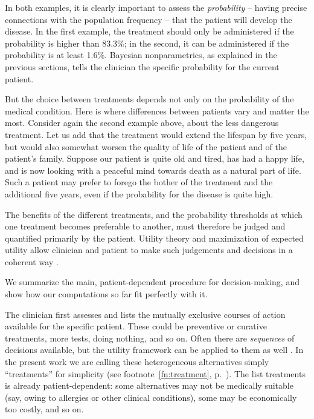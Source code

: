 \documentclass[a4paper,12pt,%
onecolumn,oneside,article,%
british%
]{memoir}
\theoremstyle{remark}
\theoremstyle{innote}
\renewcommand*{\|}[1][]{\nonscript\:#1\vert\nonscript\:\mathopen{}}
\begin{document}
In both examples, it is clearly important to assess the \emph{probability} -- having precise connections with the population frequency -- that the patient will develop the disease. In the first example, the treatment should only be administered if the probability is higher than 83.3\%; in the second, it can be administered if the probability is at least 1.6\%. Bayesian nonparametrics, as explained in the previous sections, tells the clinician the specific probability for the current patient.

But the choice between treatments depends not only on the probability of the medical condition. Here is where differences between patients vary and matter the most. Consider again the second example above, about the less dangerous treatment. Let us add that the treatment would extend the lifespan by five years, but would also somewhat worsen the quality of life of the patient and of the patient's family. Suppose our patient is quite old and tired, has had a happy life, and is now looking with a peaceful mind towards death as a natural part of life. Such a patient may prefer to forego the bother of the treatment and the additional five years, even if the probability for the disease is quite high.

The benefits of the different treatments, and the probability thresholds at which one treatment becomes preferable to another, must therefore be judged and quantified primarily by the patient. Utility theory and maximization of expected utility allow clinician and patient to make such judgements and decisions in a coherent way \autocites{soxetal1988_r2013,huninketal2001_r2014,lusted1968}[see also the clear and charming exposition by][]{lindley1971_r1988}[and][]{ohaganetal2006}.

We summarize the main, patient-dependent procedure for decision-making, and show how our computations so far fit perfectly with it.

The clinician first assesses and lists the mutually exclusive courses of action available for the specific patient. These could be preventive or curative treatments, more tests, doing nothing, and so on. Often there are \emph{sequences} of decisions available, but the utility framework can be applied to them as well \autocites[see references above and][]{raiffa1968_r1970}. In the present work we are calling these heterogeneous alternatives simply \enquote{treatments} for simplicity (see footnote~\ref{fn:treatment}, p.~\pageref{fn:treatment}). The list treatments is already patient-dependent: some alternatives may not be medically suitable (say, owing to allergies or other clinical conditions), some may be economically too costly, and so on.
\end{document}
